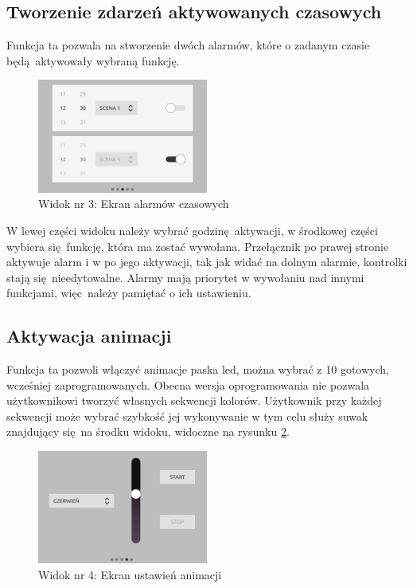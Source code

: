\documentclass[12pt, eng, twoside, openany, final]{mgr}
\begin{document}
        \subsection{Tworzenie zdarzeń aktywowanych czasowych}
        Funkcja ta pozwala na stworzenie dwóch alarmów, które o zadanym czasie będą aktywowały wybraną funkcję. 
            \begin{figure}[H]
            \begin{center}
                \includegraphics[width=0.5\textwidth]{ui_time.jpg}
                \caption{Widok nr 3: Ekran alarmów czasowych} 
                \label{fig:view3}
            \end{center}
            \end{figure}
            
        W lewej części widoku należy wybrać godzinę aktywacji, w środkowej części wybiera się funkcję, która ma zostać wywołana. Przełącznik po prawej stronie aktywuje alarm i w po jego aktywacji, tak jak widać na dolnym alarmie, kontrolki stają się nieedytowalne. Alarmy mają priorytet w wywołaniu nad innymi funkcjami, więc~należy pamiętać o ich ustawieniu.
        
        \subsection{Aktywacja animacji}
        Funkcja ta pozwoli włączyć animacje paska led, można wybrać z 10 gotowych, wcześniej zaprogramowanych. Obecna wersja oprogramowania nie pozwala użytkownikowi tworzyć własnych sekwencji kolorów. Użytkownik przy każdej sekwencji może wybrać szybkość jej wykonywanie w tym celu służy suwak znajdujący się na środku widoku, widoczne na rysunku \ref{fig:view5}.
            \begin{figure}[H]
            \begin{center}
                \includegraphics[width=0.5\textwidth]{ui_animation.jpg}
                \caption{Widok nr 4: Ekran ustawień animacji}
                \label{fig:view5}
            \end{center}
            \end{figure}
        
\end{document}
